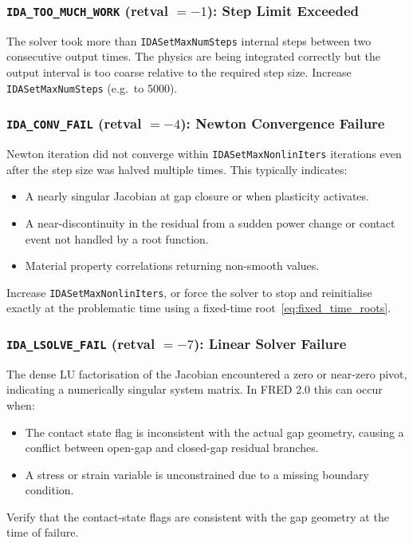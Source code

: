 \begin{refsection}
\subsubsection{\texttt{IDA\_TOO\_MUCH\_WORK} (retval $= -1$): Step Limit Exceeded}

The solver took more than \texttt{IDASetMaxNumSteps} internal steps between two consecutive output times. The physics are being integrated correctly but the output interval is too coarse relative to the required step size. Increase \texttt{IDASetMaxNumSteps} (e.g.\ to 5000).

\subsubsection{\texttt{IDA\_CONV\_FAIL} (retval $= -4$): Newton Convergence Failure}

Newton iteration did not converge within \texttt{IDASetMaxNonlinIters} iterations even after the step size was halved multiple times. This typically indicates:
\begin{itemize}
\item A nearly singular Jacobian at gap closure or when plasticity activates.
\item A near-discontinuity in the residual from a sudden power change or contact event not handled by a root function.
\item Material property correlations returning non-smooth values.
\end{itemize}
Increase \texttt{IDASetMaxNonlinIters}, or force the solver to stop and reinitialise exactly at the problematic time using a fixed-time root~\eqref{eq:fixed_time_roots}.

\subsubsection{\texttt{IDA\_LSOLVE\_FAIL} (retval $= -7$): Linear Solver Failure}

The dense LU factorisation of the Jacobian encountered a zero or near-zero pivot, indicating a numerically singular system matrix. In FRED 2.0 this can occur when:
\begin{itemize}
\item The contact state flag is inconsistent with the actual gap geometry, causing a conflict between open-gap and closed-gap residual branches.
\item A stress or strain variable is unconstrained due to a missing boundary condition.
\end{itemize}
Verify that the contact-state flags are consistent with the gap geometry at the time of failure.


\end{refsection}
